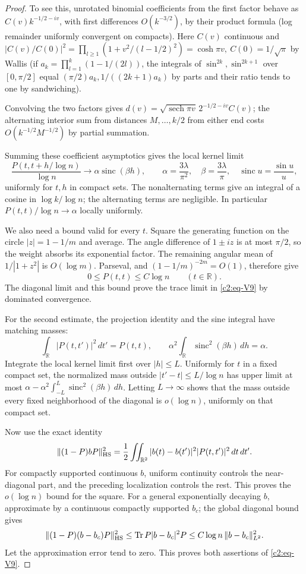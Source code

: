 \begin{proof}
To see this, unrotated binomial coefficients from the first factor behave as \(C(v) k^{-1/2-iv}\), with first differences \(O(k^{-3/2})\), by their product formula (log remainder uniformly convergent on compacts). Here \(C(v)\) continuous and \(|C(v)/C(0)|^2=\prod_{l\ge1}(1+v^2/(l-1/2)^2)=\cosh\pi v,\ C(0)=1/\sqrt\pi\) by Wallis (if \(a_k=\prod_{l=1}^k(1-1/(2l))\), the integrals of \(\sin^{2k},\sin^{2k+1}\) over \([0,\pi/2]\) equal \((\pi/2)a_k,1/((2k+1)a_k)\) by parts and their ratio tends to one by sandwiching). 

Convolving the two factors gives \(d(v)=\sqrt{\operatorname{sech}\pi v}\,2^{-1/2-iv} C(v)\); the alternating interior sum from distances \(M,\ldots,k/2\) from either end costs \(O(k^{-1/2}M^{-1/2})\) by partial summation.

Summing these coefficient asymptotics gives the local kernel limit
\[
 \frac{P(t,t+h/\log n)}{\log n}
 \longrightarrow \alpha\operatorname{sinc}(\beta h),\qquad
 \alpha=\frac{3\lambda}{\pi^2},\quad \beta=\frac{3\lambda}{\pi},
 \quad \operatorname{sinc}u=\frac{\sin u}{u},
\]
uniformly for \(t,h\) in compact sets. The nonalternating terms give
an integral of a cosine in \(\log k/\log n\); the alternating terms
are negligible. In particular \(P(t,t)/\log n\to\alpha\) locally
uniformly.

We also need a bound valid for every \(t\). Square the generating
function on the circle \(|z|=1-1/m\) and average. The angle difference
of \(1\pm iz\) is at most \(\pi/2\), so the weight absorbs its
exponential factor. The remaining angular mean of
\(1/|1+z^2|\) is \(O(\log m)\). Parseval, and
\((1-1/m)^{-2m}=O(1)\), therefore give
\[
 0\le P(t,t)\le C\log n\qquad(t\in\mathbb R).
\]
The diagonal limit and this bound prove the trace limit in
\eqref{c2:eq-V9} by dominated convergence.

For the second estimate, the projection identity and the sine integral
have matching masses:
\[
 \int_{\mathbb R}|P(t,t')|^2\,dt'=P(t,t),\qquad
 \alpha^2\int_{\mathbb R}\operatorname{sinc}^2(\beta h)\,dh
 =\alpha.
\]
Integrate the local kernel limit first over \(|h|\le L\). Uniformly
for \(t\) in a fixed compact set, the normalized mass outside
\(|t'-t|\le L/\log n\) has upper limit at most
\(\alpha-\alpha^2\int_{-L}^L\operatorname{sinc}^2(\beta h)\,dh\).
Letting \(L\to\infty\) shows that the mass outside every fixed
neighborhood of the diagonal is \(o(\log n)\), uniformly on that
compact set.

Now use the exact identity
\[
 \|(1-P)bP\|_{\rm HS}^2
 =\frac12\iint_{\mathbb R^2}|b(t)-b(t')|^2
                         |P(t,t')|^2\,dt\,dt'.
\]
For compactly supported continuous \(b\), uniform continuity controls
the near-diagonal part, and the preceding localization controls the
rest. This proves the \(o(\log n)\) bound for the square. For a general
exponentially decaying \(b\), approximate by a continuous compactly
supported \(b_c\); the global diagonal bound gives
\[
 \|(1-P)(b-b_c)P\|_{\rm HS}^2
 \le \operatorname{Tr}P|b-b_c|^2P
 \le C\log n\,\|b-b_c\|_{L^2}^2.
\]
Let the approximation error tend to zero. This proves both assertions
of \eqref{c2:eq-V9}.


\end{proof}
